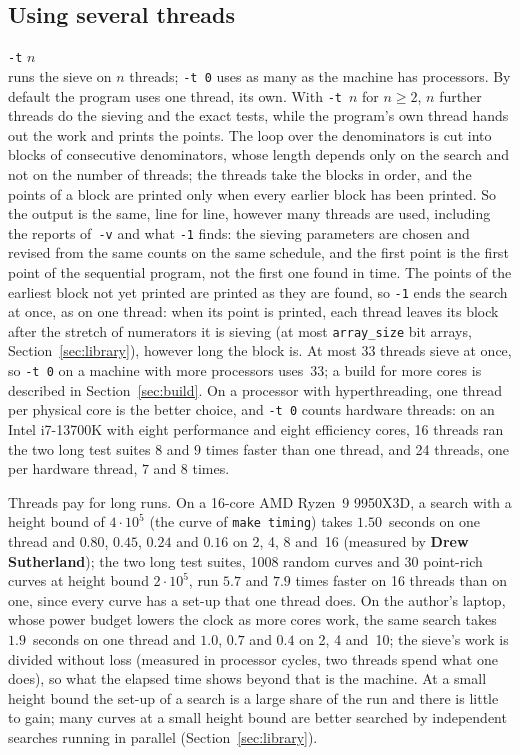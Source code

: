 \documentclass[12pt,a4paper,oneside]{amsart}
\begin{document}
\subsection{Using several threads}\label{sec:threads}

\strut\quad\verb+-t+ $n$ \\
runs the sieve on $n$ threads; \verb+-t 0+ uses as many as the machine has
processors. By default the program uses one thread, its own. With
\verb+-t+~$n$ for $n \ge 2$, $n$ further threads do the sieving and the exact
tests, while the program's own thread hands out the work and prints the
points. The loop over the denominators is cut into blocks of consecutive
denominators, whose length depends only on the search and not on the
number of threads; the threads take the blocks in order, and the points
of a block are printed only when every earlier block has been printed.
So the output is the same, line for line, however many threads are used,
including the reports of~\verb+-v+ and what \verb+-1+ finds: the sieving
parameters are chosen and revised from the same counts on the same
schedule, and the first point is the first point of the sequential
program, not the first one found in time. The points of the earliest
block not yet printed are printed as they are found, so \verb+-1+ ends
the search at once, as on one thread: when its point is printed, each
thread leaves its block after the stretch of numerators it is sieving
(at most \texttt{array\_size} bit arrays, Section~\ref{sec:library}),
however long the block is. At most $33$ threads sieve at
once, so \verb+-t 0+ on a machine with more processors uses~$33$; a
build for more cores is described in Section~\ref{sec:build}. On a
processor with hyperthreading, one thread per physical core is the better
choice, and \verb+-t 0+ counts hardware threads: on an Intel i7-13700K
with eight performance and eight efficiency cores, 16 threads ran the two
long test suites $8$ and $9$ times faster than one thread, and 24 threads,
one per hardware thread, $7$ and $8$ times.

Threads pay for long runs. On a 16-core AMD Ryzen~9 9950X3D, a search
with a height bound of $4\cdot10^5$ (the curve of \texttt{make timing})
takes $1.50$~seconds on one thread and $0.80$, $0.45$, $0.24$ and $0.16$
on 2, 4, 8 and~16 (measured by \textbf{Drew Sutherland}); the two long
test suites, 1008 random curves and 30 point-rich curves at height bound
$2\cdot10^5$, run $5.7$ and $7.9$ times faster on 16 threads than on one,
since every curve has a set-up that one thread does. On the author's
laptop, whose power budget lowers the clock as more cores work, the same
search takes $1.9$~seconds on one thread and $1.0$, $0.7$ and $0.4$ on 2,
4 and~10; the sieve's work is divided without loss (measured in processor
cycles, two threads spend what one does), so what the elapsed time shows
beyond that is the machine. At a small height bound the set-up of a
search is a large share of the run and there is little to gain; many
curves at a small height bound are better searched by independent
searches running in parallel (Section~\ref{sec:library}).
\end{document}
